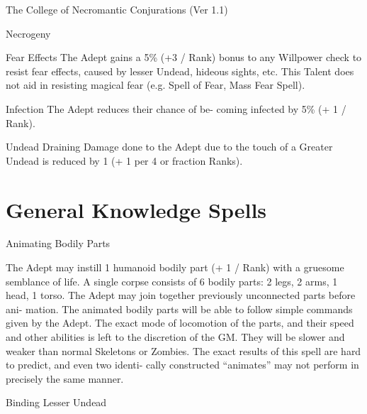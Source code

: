\begin{Chapter}{The College of Necromantic Conjurations (Ver 1.1)}
\begin{talent}[T-3]{Necrogeny }
\begin{effects}
Fear  Effects  The  Adept  gains  a  5\%  (+3  /  Rank) 
bonus to any Willpower check to resist fear effects, 
caused  by  lesser  Undead,  hideous  sights,  etc.  This 
Talent  does  not  aid  in  resisting  magical  fear  (e.g. 
Spell of Fear, Mass Fear Spell). 

Infection  The  Adept  reduces  their  chance  of  be-
coming infected by 5\% (+ 1 / Rank). 

Undead Draining Damage done to the Adept due 
to the touch of a Greater Undead is reduced by 1 (+ 
1 per 4 or fraction Ranks). 

\end{effects}
\end{talent}

\section{General Knowledge Spells}

\begin{spell}[G-1]{Animating Bodily Parts }

\begin{effects}
 The  Adept  may  instill  1  humanoid  bodily 
part  (+  1  /  Rank)  with  a  gruesome  semblance  of 
life.  A  single  corpse  consists  of  6  bodily  parts:  2 
legs,  2  arms,  1 head, 1 torso.  The  Adept  may  join 
together  previously  unconnected  parts  before  ani-
mation.  The  animated  bodily  parts  will  be  able  to 
follow  simple  commands  given by  the  Adept.  The 
exact  mode  of  locomotion  of  the  parts,  and  their 
speed and other abilities is left to the discretion of 
the  GM.  They  will  be  slower  and  weaker  than 
normal Skeletons or Zombies. The exact results of 
this  spell  are  hard to  predict,  and  even  two  identi-
cally  constructed  “animates”  may  not  perform  in 
precisely the same manner. 

\end{effects}
\end{spell}

\begin{spell}[G-2]{Binding Lesser Undead }


\end{spell}
\end{Chapter}

